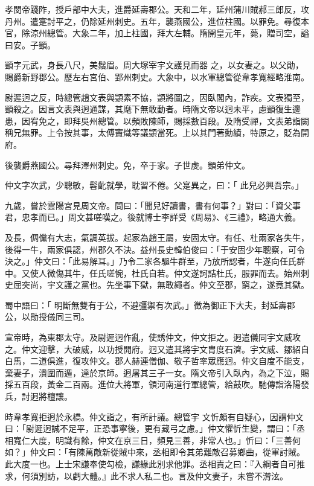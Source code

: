 \begin{pinyinscope}
 孝閔帝踐阼，授戶部中大夫，進爵延壽郡公。天和二年，延州蒲川賊郝三郎反，攻丹州。遣寔討平之，仍除延州刺史。五年，襲燕國公，進位柱國。以罪免。尋復本官，除涼州總管。大象二年，加上柱國，拜大左輔。隋開皇元年，薨，贈司空，謚曰安。子顗。



 顗字元武，身長八尺，美鬚眉。周大塚宰宇文護見而器
 之，以女妻之。以父勛，賜爵新野郡公。歷左右宮伯、郢州刺史。大象中，以水軍總管從韋孝寬經略淮南。



 尉遲迥之反，時總管趙文表與顗素不協，顗將圖之，因臥閣內，詐疾。文表獨至，顗殺之。因言文表與迥通謀，其麾下無敢動者。時隋文帝以迥未平，慮顗復生邊患，因宥免之，即拜吳州總管。以頻敗陳師，賜採數百段。及隋受禪，文表弟詣闕稱兄無罪。上令按其事，太傅竇熾等議顗當死。上以其門著勳績，特原之，貶為開府。



 後襲爵燕國公。尋拜澤州刺史。免，卒于家。子世虔。顗弟仲文。



 仲文字次武，少聰敏，髫齔就學，耽習不倦。父寔異之，曰：「
 此兒必興吾宗。」



 九歲，嘗於雲陽宮見周文帝。問曰：「聞兒好讀書，書有何事？」對曰：「資父事君，忠孝而已。」周文甚嗟嘆之。後就博士李詳受《周易》、《三禮》，略通大義。



 及長，倜儻有大志，氣調英拔。起家為趙王屬，安固太守。有任、杜兩家各失牛，後得一牛，兩家俱認，州郡久不決。益州長史韓伯俊曰：「于安固少年聰察，可令決之。」仲文曰：「此易解耳。」乃令二家各驅牛群至，乃放所認者，牛遂向任氏群中。又使人微傷其牛，任氏嗟惋，杜氏自若。仲文遂訶詰杜氏，服罪而去。始州刺史屈突尚，宇文護之黨也。先坐事下獄，無敢繩者。仲文至郡，窮之，遂竟其獄。



 蜀中語曰：「
 明斷無雙有于公，不避彊禦有次武。」徵為御正下大夫，封延壽郡公，以勛授儀同三司。



 宣帝時，為東郡太守。及尉遲迥作亂，使誘仲文，仲文拒之。迥遣儀同宇文威攻之。仲文迎擊，大破威，以功授開府。迥又遣其將宇文胄度石濟。宇文威、鄒紹自白馬，二道俱進，復攻仲文。郡人赫連僧伽、敬子哲率眾應迥。仲文自度不能支，棄妻子，潰圍而遁，達於京師。迥屠其三子一女。隋文帝引入臥內，為之下泣，賜採五百段，黃金二百兩。進位大將軍，領河南道行軍總管，給鼓吹。馳傳詣洛陽發兵，討迥將檀讓。



 時韋孝寬拒迥於永橋。仲文詣之，有所計議。總管宇
 文忻頗有自疑心，因謂仲文曰：「尉遲迥誠不足平，正恐事寧後，更有藏弓之慮。」仲文懼忻生變，謂曰：「丞相寬仁大度，明識有餘，仲文在京三日，頻見三善，非常人也。」忻曰：「三善何如？」仲文曰：「有陳萬敵新從賊中來，丞相即令其弟難敵召募鄉曲，從軍討賊。此大度一也。上士宋謙奉使勾檢，謙緣此別求他罪。丞相責之曰：『入綱者自可推求，何須別訪，以虧大體。』此不求人私二也。言及仲文妻子，未嘗不潸泫。




\end{pinyinscope}
